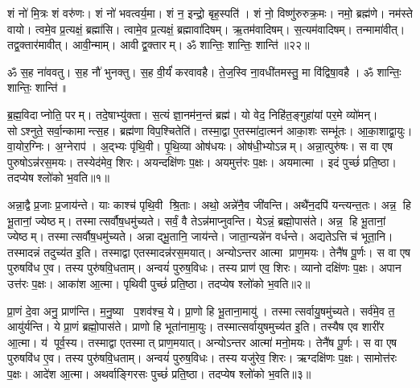 शं नो॑ मि॒त्रः  शं वरु॑णः। शं नो॑ भवत्वर्य॒मा। शं न॒ इन्द्रो॒ बृह॒स्पति॑। शं नो॒ विष्णु॑रुरुक्र॒मः। नमो॒ ब्रह्म॑णे। नम॑स्ते वायो। त्वमे॒व प्र॒त्यक्षं॒ ब्रह्मा॑सि। त्वामे॒व प्र॒त्यक्षं॒ ब्रह्मावा॑दिषम्। ऋ॒तम॑वादिषम्। स॒त्यम॑वादिषम्। तन्मामा॑वीत्। तद्व॒क्तार॑मावीत्। आवी॒न्माम्। आवीद्व॒क्तारम्। ॐ शान्तिः॒ शान्तिः॒ शान्ति॑॥२२॥
\anuvakamend[स॒त्यम॑वादिषं॒ पञ्च॑ च]


\setcounter{anuvakam}{0}
ॐ स॒ह ना॑ववतु। स॒ह नौ॑ भुनक्तु। स॒ह वी॒र्यं॑ करवावहै। ते॒ज॒स्वि ना॒वधी॑तमस्तु॒ मा वि॑द्विषा॒वहै। ॐ शान्तिः॒ शान्तिः॒ शान्ति॑॥%


ब्र॒ह्म॒विदाप्नोति॒ परम्। तदे॒षाभ्यु॑क्ता। स॒त्यं ज्ञा॒नम॑न॒न्तं ब्रह्म॑। यो वेद॒ निहि॑त॒ङ्गुहा॑यां पर॒मे व्यो॑मन्। सोऽश्नुते॒ सर्वा॒न्कामान्त्स॒ह। ब्रह्म॑णा विप॒श्चितेति॑। तस्मा॒द्वा ए॒तस्मा॑दा॒त्मन॑ आका॒शः सम्भू॑तः। आ॒का॒शाद्वा॒युः। वा॒योर॒ग्निः। अ॒ग्नेराप॑। अ॒द्भ्यः पृ॑थि॒वी। पृ॒थि॒व्या ओष॑धयः। ओष॑धी॒भ्योऽन्नम्। अन्ना॒त्पुरु॑षः। स वा एष पुरुषोऽन्न॑रस॒मयः। तस्येद॑मेव॒ शिरः। अयन्दक्षि॑णः प॒क्षः। अयमुत्त॑रः प॒क्षः। अयमात्मा। इदं पुच्छं॑ प्रति॒ष्ठा। तदप्येष श्लो॑को भ॒वति॥१॥

अन्ना॒द्वै प्र॒जाः प्र॒जाय॑न्ते। याः काश्च॑ पृथि॒वी श्रि॒ताः। अथो॒ अन्ने॑नै॒व जी॑वन्ति। अथै॑न॒दपि॑ यन्त्यन्त॒तः। अन्न॒ हि भू॒तानां॒ ज्येष्ठम्। तस्मात्सर्वौष॒धमु॑च्यते। सर्वं॒ वै तेऽन्न॑माप्नुवन्ति। येऽन्नं॒ ब्रह्मो॒पास॑ते। अन्न॒ हि भू॒तानां॒ ज्येष्ठम्। तस्मात्सर्वौष॒धमु॑च्यते। अन्नाद्भू॒तानि॒ जाय॑न्ते। जाता॒न्यन्ने॑न वर्धन्ते। अद्यतेऽत्ति च॑ भूता॒नि। तस्मादन्नं तदुच्य॑त इ॒ति। तस्माद्वा एतस्मादन्न॑रस॒मयात्। अन्योऽन्तर आत्मा प्राण॒मयः। तेनै॑ष पू॒र्णः। स वा एष पुरुषवि॑ध ए॒व। तस्य पुरु॑षवि॒धताम्। अन्वयं॑ पुरुष॒विधः। तस्य प्राण॑ एव॒ शिरः। व्यानो दक्षि॑णः प॒क्षः। अपान उत्त॑रः प॒क्षः। आका॑श आ॒त्मा। पृथिवी पुच्छं॑ प्रति॒ष्ठा। तदप्येष श्लो॑को भ॒वति॥२॥

प्रा॒णं दे॒वा अनु॒ प्राण॑न्ति। म॒नु॒ष्या प॒शव॑श्च॒ ये। प्रा॒णो हि भू॒ताना॒मायु॑। तस्मात्सर्वायु॒षमु॑च्यते। सर्व॑मे॒व त॒ आयु॑र्\mbox{}यन्ति। ये प्रा॒णं ब्रह्मो॒पास॑ते। प्राणो हि भूता॑नामा॒युः। तस्मात्सर्वायुषमुच्य॑त इ॒ति। तस्यैष एव शारी॑र आ॒त्मा। य॑ पूर्व॒स्य। तस्माद्वा एतस्मात् प्राण॒मयात्। अन्योऽन्तर आत्मा॑ मनो॒मयः। तेनै॑ष पू॒र्णः। स वा एष पुरुषवि॑ध ए॒व। तस्य पुरु॑षवि॒धताम्। अन्वयं॑ पुरुष॒विधः। तस्य यजु॑रेव॒ शिरः। ऋग्दक्षि॑णः प॒क्षः। सामोत्त॑रः प॒क्षः। आदे॑श आ॒त्मा। अथर्वाङ्गिरसः पुच्छं॑ प्रति॒ष्ठा। तदप्येष श्लो॑को भ॒वति॥३॥

